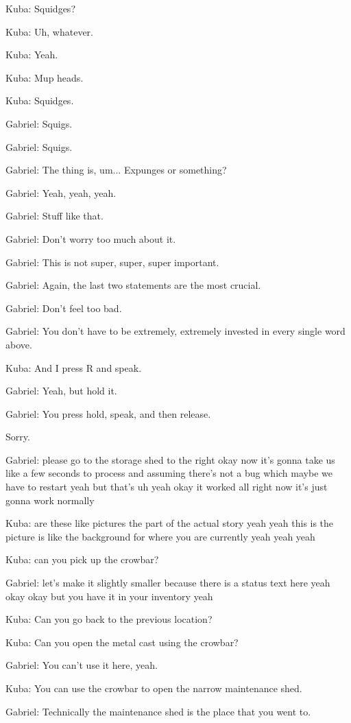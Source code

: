 Kuba: Squidges?

Kuba: Uh, whatever.

Kuba: Yeah.

Kuba: Mup heads.

Kuba: Squidges.

Gabriel: Squigs.

Gabriel: Squigs.

Gabriel: The thing is, um... Expunges or something?

Gabriel: Yeah, yeah, yeah.

Gabriel: Stuff like that.

Gabriel: Don't worry too much about it.

Gabriel: This is not super, super, super important.

Gabriel: Again, the last two statements are the most crucial.

Gabriel: Don't feel too bad.

Gabriel: You don't have to be extremely, extremely invested in every single word above.

Kuba: And I press R and speak.

Gabriel: Yeah, but hold it.

Gabriel: You press hold, speak, and then release.

Sorry.

Gabriel: please go to the storage shed to the right okay now it's gonna take us like a few seconds to process and assuming there's not a bug which maybe we have to restart yeah but that's uh yeah okay it worked all right now it's just gonna work normally

Kuba: are these like pictures the part of the actual story yeah yeah this is the picture is like the background for where you are currently yeah yeah yeah

Kuba: can you pick up the crowbar?

Gabriel: let's make it slightly smaller because there is a status text here yeah okay okay but you have it in your inventory yeah

Kuba: Can you go back to the previous location?

Kuba: Can you open the metal cast using the crowbar?

Gabriel: You can't use it here, yeah.

Kuba: You can use the crowbar to open the narrow maintenance shed.

Gabriel: Technically the maintenance shed is the place that you went to.

